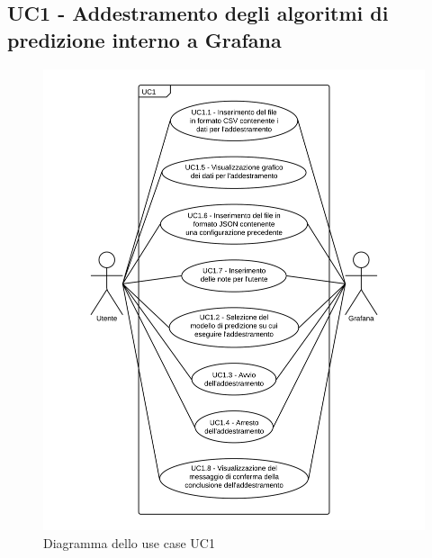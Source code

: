 \subsection{UC1 - Addestramento degli algoritmi di predizione interno a Grafana}
\begin{figure}[H]
\includegraphics[width=\textwidth,height=\textheight,keepaspectratio]{img/UC1_-_Addestramento_degli_algoritmi_di_predizione_interno_a_Grafana.png}
\caption{Diagramma dello use case UC1}
\end{figure}
